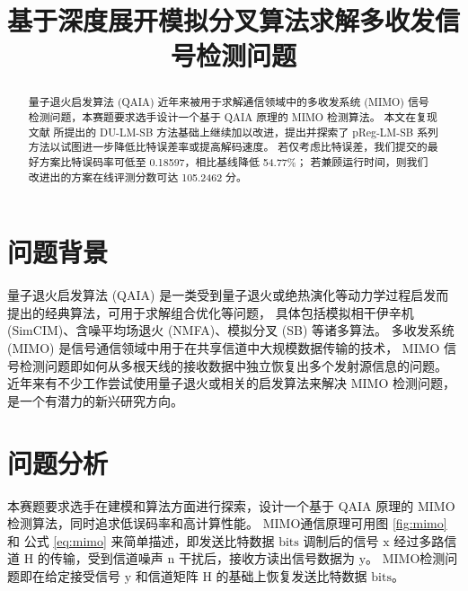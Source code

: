 \documentclass[withoutpreface,bwprint]{cumcmthesis}
\title{基于深度展开模拟分叉算法求解多收发信号检测问题}
\begin{document}
\maketitle
\begin{abstract}
量子退火启发算法 (QAIA) 近年来被用于求解通信领域中的多收发系统 (MIMO) 信号检测问题，本赛题要求选手设计一个基于 QAIA 原理的 MIMO 检测算法。
本文在复现文献 \cite{Takabe2023} 所提出的 DU-LM-SB 方法基础上继续加以改进，提出并探索了 pReg-LM-SB 系列方法以试图进一步降低比特误差率或提高解码速度。
若仅考虑比特误差，我们提交的最好方案比特误码率可低至 0.18597，相比基线降低 54.77\%；
若兼顾运行时间，则我们改进出的方案在线评测分数可达 105.2462 分。

\end{abstract}




\section{问题背景}

量子退火启发算法 (QAIA) 是一类受到量子退火或绝热演化等动力学过程启发而提出的经典算法，可用于求解组合优化等问题，
具体包括模拟相干伊辛机 (SimCIM)、含噪平均场退火 (NMFA)、模拟分叉 (SB) 等诸多算法。
多收发系统 (MIMO) 是信号通信领域中用于在共享信道中大规模数据传输的技术，
MIMO 信号检测问题即如何从多根天线的接收数据中独立恢复出多个发射源信息的问题。
近年来有不少工作尝试使用量子退火或相关的启发算法来解决 MIMO 检测问题，是一个有潜力的新兴研究方向。


\section{问题分析}

本赛题要求选手在建模和算法方面进行探索，设计一个基于 QAIA 原理的 MIMO 检测算法，同时追求低误码率和高计算性能。
MIMO通信原理可用图 \ref{fig:mimo} 和 公式 \ref{eq:mimo} 来简单描述，即发送比特数据 $ \mathrm{bits} $ 调制后的信号 $ \mathrm{x} $ 经过多路信道 $ \mathrm{H} $ 的传输，受到信道噪声 $ \mathrm{n} $ 干扰后，接收方读出信号数据为 $ \mathrm{y} $。
MIMO检测问题即在给定接受信号 $ \mathrm{y} $ 和信道矩阵 $ \mathrm{H} $ 的基础上恢复发送比特数据 $ \mathrm{bits} $。
\end{document}
